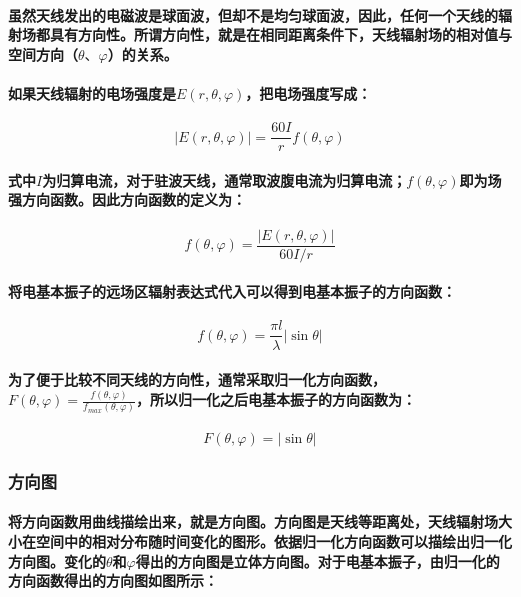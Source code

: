 \documentclass[UTF8]{ctexart}
\begin{document}
\paragraph{虽然天线发出的电磁波是球面波，但却不是均匀球面波，因此，任何一个天线的辐射场都具有方向性。所谓方向性，就是在相同距离条件下，天线辐射场的相对值与空间方向（$\theta 、\varphi$）的关系。}
\paragraph{如果天线辐射的电场强度是$E(r,\theta,\varphi)$，把电场强度写成：}
\begin{equation}
|E(r,\theta,\varphi)| = \frac{60I}{r}f(\theta,\varphi)
\end{equation}
\paragraph{式中$I$为归算电流，对于驻波天线，通常取波腹电流为归算电流；$f(\theta,\varphi)$即为场强方向函数。因此方向函数的定义为：}
\begin{equation}
f(\theta,\varphi) = \frac{|E(r,\theta,\varphi)|}{60I/r}
\end{equation}
\paragraph{将电基本振子的远场区辐射表达式代入可以得到电基本振子的方向函数：}
\begin{equation}
f(\theta,\varphi) = \frac{\pi l}{\lambda}|\sin \theta|
\end{equation}
\paragraph{为了便于比较不同天线的方向性，通常采取归一化方向函数，$F(\theta,\varphi) = \frac{f(\theta,\varphi)}{f_{max}(\theta,\varphi)}$，所以归一化之后电基本振子的方向函数为：}
\begin{equation}
F(\theta,\varphi) = |\sin \theta|
\end{equation}
\subsubsection{方向图}
\paragraph{将方向函数用曲线描绘出来，就是方向图。方向图是天线等距离处，天线辐射场大小在空间中的相对分布随时间变化的图形。依据归一化方向函数可以描绘出归一化方向图。变化的$\theta$和$\varphi$得出的方向图是立体方向图。对于电基本振子，由归一化的方向函数得出的方向图如图所示：}
\end{document}
